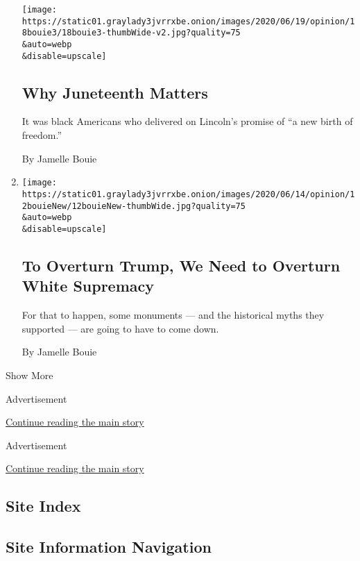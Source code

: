 \begin{enumerate}
  \texttt{[image: https://static01.graylady3jvrrxbe.onion/images/2020/06/19/opinion/18bouie3/18bouie3-thumbWide-v2.jpg?quality=75\\\&auto=webp\\\&disable=upscale]}

  \hypertarget{why-juneteenth-matters}{%
  \subsection{Why Juneteenth Matters}\label{why-juneteenth-matters}}

  It was black Americans who delivered on Lincoln's promise of ``a new
  birth of freedom.''

  By Jamelle Bouie
\item
  \href{/2020/06/12/opinion/sunday/floyd-protests-white-supremacy.html}{}

  \texttt{[image: https://static01.graylady3jvrrxbe.onion/images/2020/06/14/opinion/12bouieNew/12bouieNew-thumbWide.jpg?quality=75\\\&auto=webp\\\&disable=upscale]}

  \hypertarget{to-overturn-trump-we-need-to-overturn-white-supremacy}{%
  \subsection{To Overturn Trump, We Need to Overturn White
  Supremacy}\label{to-overturn-trump-we-need-to-overturn-white-supremacy}}

  For that to happen, some monuments --- and the historical myths they
  supported --- are going to have to come down.

  By Jamelle Bouie
\end{enumerate}

Show More

Advertisement

\protect\hyperlink{after-mid1}{Continue reading the main story}

Advertisement

\protect\hyperlink{after-mktg}{Continue reading the main story}

\hypertarget{site-index}{%
\subsection{Site Index}\label{site-index}}

\hypertarget{site-information-navigation}{%
\subsection{Site Information
Navigation}\label{site-information-navigation}}

